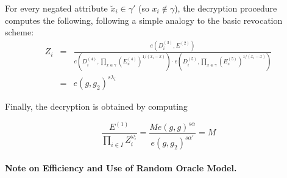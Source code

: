 For every negated attribute $\breve{x}_i \in \gamma'$
(so $x_i \notin \gamma$), the decryption procedure computes the following, following a simple analogy to the basic revocation scheme:
%
%
\begin{eqnarray*}
Z_i &=&
\frac{e\left(D^{(3)}_i, E^{(2)}\right)}
{
e\left(D^{(4)}_i,
\prod_{x \in \gamma} \left(E^{(4)}_x\right)^{1/(x_i-x)}\right)
\cdot
e\left(D^{(5)}_i,
\prod_{x \in \gamma} \left(E^{(5)}_x\right)^{1/(x_i-x)}\right)
} \\
&=&
e\left(g,g_2\right)^{s \lambda_i}
\end{eqnarray*}


Finally, the decryption is obtained by computing

$$
\frac{E^{(1)}}{\prod_{i \in I} Z_i^{\omega_i}}
=
\frac{M e(g,g)^{s \alpha}}{e(g,g_2)^{s \alpha'}} = M$$


\paragraph{Note on Efficiency and Use of Random Oracle Model.}